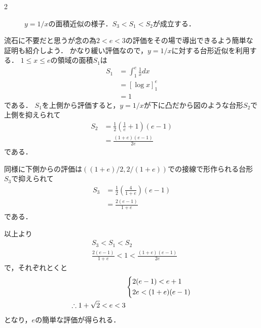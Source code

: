 \documentclass[../../../../main.tex]{subfiles}
\begin{document}
\begin{multicols}{2}
\begin{figure}[H]

        \caption{$y=1/x$の面積近似の様子．$S_3<S_1<S_2$が成立する．}
    \end{figure}

    流石に不要だと思うが念の為$2<e<3$の評価をその場で導出できるよう簡単な証明も紹介しよう．
    かなり緩い評価なので，$y=1/x$に対する台形近似を利用する．
    $1\le x \le e$の領域の面積$S_1$は
    \begin{align*}
        S_1
         & = \int_{1}^{e}\frac{1}{x} dx   \\
         & = \left[\log x \right]_{1}^{e} \\
         & = 1
    \end{align*}
    である．
    $S_1$を上側から評価すると，$y=1/x$が下に凸だから図のような台形$S_2$で上側を抑えられて
    \begin{align*}
        S_2
         & = \frac{1}{2}\left(\frac{1}{e}+1\right)\left(e-1\right) \\
         & = \frac{(1+e)(e-1)}{2e}
    \end{align*}
    である．

    同様に下側からの評価は$((1+e)/2,2/(1+e))$での接線で形作られる台形$S_3$で抑えられて
    \begin{align*}
        S_3
         & = \frac{1}{2}\left(\frac{4}{1+e}\right)\left(e-1\right) \\
         & = \frac{2(e-1)}{1+e}
    \end{align*}
    である．

    以上より
    \begin{align*}
         & S_3 < S_1 < S_2                                \\
         & \frac{2(e-1)}{1+e} < 1 < \frac{(1+e)(e-1)}{2e}
    \end{align*}
    で，それぞれとくと
    \begin{align*}
         & \begin{dcases}
               2(e-1) < e+1 \\
               2e < (1+e)(e-1)
           \end{dcases} \\
        \therefore
        1+\sqrt{2} < e < 3
    \end{align*}
    となり，$e$の簡単な評価が得られる．


    \newpage
\end{multicols}
\end{document}
